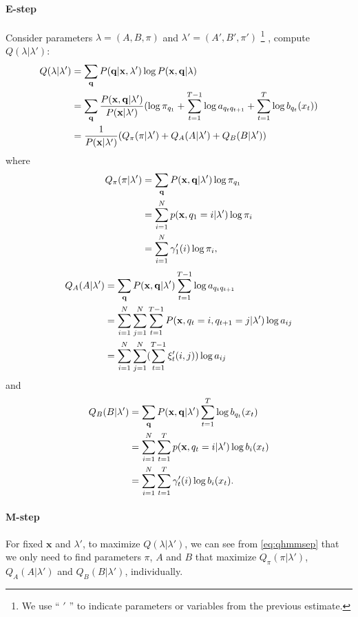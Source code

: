 \documentclass[12pt,final,twoside]{report}
\theoremstyle{plain}
\theoremstyle{definition}
\theoremstyle{remark}
\begin{document}
\paragraph{E-step}
Consider parameters $\lambda=(A,B,\pi)$ and $\lambda'=(A',B',\pi')$ 
\footnote{We use `` $'$ '' to indicate parameters or variables from the previous estimate.}
, compute $Q(\lambda|\lambda')$:
\begin{align}
  Q(\lambda|\lambda') &= \sum_{\mathbf{q}} P(\mathbf{q}|\mathbf{x},\lambda') \log P(\mathbf{x},\mathbf{q}|\lambda) \notag\\
  &= \sum_{\mathbf{q}} \frac{P(\mathbf{x},\mathbf{q}|\lambda')}{P(\mathbf{x}|\lambda')} 
  (\log \pi_{q_1} + \sum_{t=1}^{T-1} \log a_{q_t q_{t+1}} + \sum_{t=1}^{T} \log b_{q_t}(x_t) ) \notag\\
  &= \frac{1}{P(\mathbf{x}|\lambda')} (Q_\pi(\pi|\lambda') + Q_A(A|\lambda') + Q_B(B|\lambda'))
  \label{eq:qhmmsep}
\end{align}
where
\begin{align}
  Q_\pi(\pi|\lambda') &= \sum_{\mathbf{q}} P(\mathbf{x},\mathbf{q}|\lambda') \log \pi_{q_1}  \notag\\
  &= \sum_{i=1}^{N} p(\mathbf{x},q_1=i|\lambda') \log \pi_{i} \notag\\
  &= \sum_{i=1}^{N} \gamma'_1(i) \log \pi_{i},
\end{align}
\begin{align}
  Q_A(A|\lambda') &= \sum_{\mathbf{q}} P(\mathbf{x},\mathbf{q}|\lambda') \sum_{t=1}^{T-1} \log a_{q_t q_{t+1}} \notag\\
  &= \sum_{i=1}^{N} \sum_{j=1}^{N} \sum_{t=1}^{T-1} P(\mathbf{x},q_t=i,q_{t+1}=j|\lambda') \log a_{ij} \notag\\
  &= \sum_{i=1}^{N} \sum_{j=1}^{N} (\sum_{t=1}^{T-1} \xi'_t(i, j)) \log a_{ij}
\end{align}
and
\begin{align}
  Q_B(B|\lambda') &= \sum_{\mathbf{q}} P(\mathbf{x},\mathbf{q}|\lambda') \sum_{t=1}^{T} \log b_{q_t}(x_t) \notag\\
  &= \sum_{i=1}^{N} \sum_{t=1}^{T} p(\mathbf{x},q_t=i|\lambda') \log b_{i}(x_t) \notag\\
  &= \sum_{i=1}^{N} \sum_{t=1}^{T} \gamma'_t(i) \log b_{i}(x_t) .
  \label{eq:qhmmb}
\end{align}

\paragraph{M-step}
For fixed $\mathbf{x}$ and $\lambda'$, to maximize $Q(\lambda|\lambda')$, we can see from \cref{eq:qhmmsep} that we only need to find parameters $\pi$, $A$ and $B$ that maximize $Q_\pi(\pi|\lambda')$, $Q_A(A|\lambda')$ and $Q_B(B|\lambda')$, individually.
\end{document}
